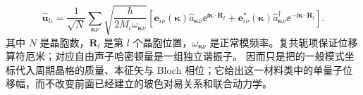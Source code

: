 \begin{equation}
\boxed{
\hat{\mathbf u}_{l\iota}
=\frac1{\sqrt N}\sum_{\boldsymbol\kappa\nu}
\sqrt{\frac{\hbar}{2M_\iota\omega_{\boldsymbol\kappa\nu}}}
\left[
\mathbf e_{\iota\nu}(\boldsymbol\kappa)\hat a_{\boldsymbol\kappa\nu}\ee^{\ii\boldsymbol\kappa\cdot\mathbf R_l}
+\mathbf e_{\iota\nu}^{*}(\boldsymbol\kappa)\hat a_{\boldsymbol\kappa\nu}^{\dagger}\ee^{-\ii\boldsymbol\kappa\cdot\mathbf R_l}
\right].}
\label{eq:phonon_displacement_quantization}
\end{equation}
其中 $N$ 是晶胞数，$\mathbf R_l$ 是第 $l$ 个晶胞位置，$\omega_{\boldsymbol\kappa\nu}$ 是正常模频率。复共轭项保证位移算符厄米；对应自由声子哈密顿量是一组独立谐振子。 因而只是把的一般模式坐标代入周期晶格的质量、本征矢与 Bloch 相位；它给出这一材料类中的单量子位移幅，而不改变前面已经建立的玻色对易关系和联合动力学。

